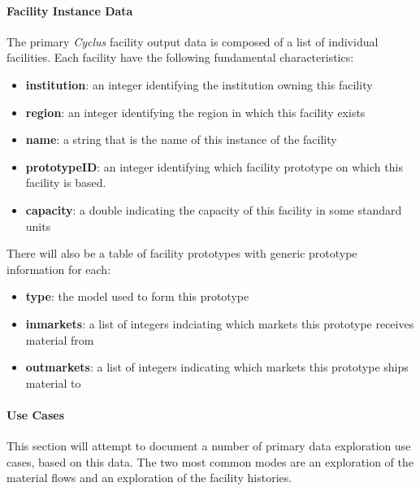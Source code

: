 \documentclass[letterpaper,10pt,english]{sphinxmanual}
\begin{document}
\paragraph{Facility Instance Data}
\label{devdoc/output_usecases:facility-instance-data}
The primary \emph{Cyclus} facility output data is composed of a list of
individual facilities.  Each facility have the following fundamental
characteristics:
\begin{itemize}
\item {} 
\textbf{institution}: an integer identifying the institution owning this facility

\item {} 
\textbf{region}: an integer identifying the region in which this facility exists

\item {} 
\textbf{name}: a string that is the name of this instance of the facility

\item {} 
\textbf{prototypeID}: an integer identifying which facility prototype on
which this facility is based.

\item {} 
\textbf{capacity}: a double indicating the capacity of this facility in
some standard units

\end{itemize}

There will also be a table of facility prototypes with generic prototype
information for each:
\begin{itemize}
\item {} 
\textbf{type}: the model used to form this prototype

\item {} 
\textbf{inmarkets}: a list of integers indciating which markets this
prototype receives material from

\item {} 
\textbf{outmarkets}: a list of integers indicating which markets this
prototype ships material to

\end{itemize}


\paragraph{Use Cases}
\label{devdoc/output_usecases:use-cases}
This section will attempt to document a number of primary data
exploration use cases, based on this data.  The two most common modes
are an exploration of the material flows and an exploration of the
facility histories.
\end{document}
